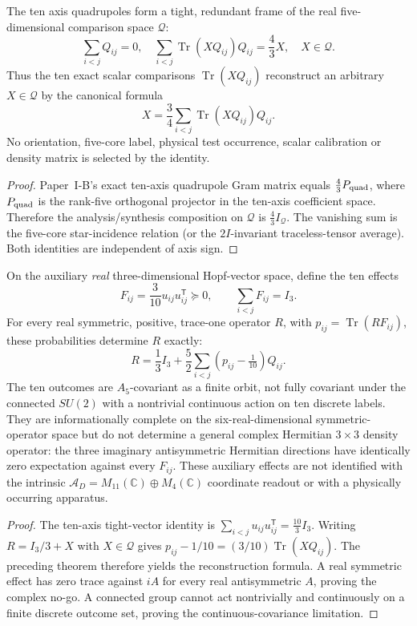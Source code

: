 \documentclass[12pt,a4paper]{article}
\begin{document}
\begin{theorem}
\label{p2c:thm:v318-quadrupole-tomography}
The ten axis quadrupoles form a tight, redundant frame of the real
five-dimensional comparison space $\mathcal Q$:
\[
 \sum_{i<j}Q_{ij}=0,\quad
 \sum_{i<j}\operatorname{Tr}(XQ_{ij})Q_{ij}=\frac43X,
 \quad X\in\mathcal Q.
\]
Thus the ten exact scalar comparisons $\operatorname{Tr}(XQ_{ij})$
reconstruct an arbitrary $X\in\mathcal Q$ by the canonical formula
\[
 \boxed{X=\frac34\sum_{i<j}
   \operatorname{Tr}(XQ_{ij})Q_{ij}.}
\]
No orientation, five-core label, physical test occurrence, scalar
calibration or density matrix is selected by the identity.
\end{theorem}
\begin{proof}
Paper~I-B's exact ten-axis quadrupole Gram matrix equals
$\frac43P_{\rm quad}$, where $P_{\rm quad}$ is the rank-five
orthogonal projector in the ten-axis coefficient space.  Therefore
the analysis/synthesis composition on $\mathcal Q$ is
$\frac43I_{\mathcal Q}$.  The vanishing sum is the five-core
star-incidence relation (or the $2I$-invariant traceless-tensor
average).  Both identities are independent of axis sign.
\end{proof}

\begin{theorem}
\label{p2c:thm:v318-real-petersen-povm}
On the auxiliary \emph{real} three-dimensional Hopf-vector space,
define the ten effects
\[
 F_{ij}=\frac3{10}u_{ij}u_{ij}^{\mathsf T}\succeq0,
 \qquad\sum_{i<j}F_{ij}=I_3.
\]
For every real symmetric, positive, trace-one operator $R$, with
$p_{ij}=\operatorname{Tr}(RF_{ij})$, these probabilities determine $R$
exactly:
\[
 \boxed{R=\frac13I_3+\frac52\sum_{i<j}
                  (p_{ij}-\tfrac1{10})Q_{ij}.}
\]
The ten outcomes are $A_5$-covariant as a finite orbit, not fully
covariant under the connected $SU(2)$ with a nontrivial continuous
action on ten discrete labels.  They are informationally complete on
the six-real-dimensional symmetric-operator space but do not determine
a general complex Hermitian $3\times3$ density operator: the three
imaginary antisymmetric Hermitian directions have identically zero
expectation against every $F_{ij}$.
These auxiliary effects are not identified with the intrinsic
$\mathcal A_D=M_{11}(\mathbb C)\oplus M_4(\mathbb C)$ coordinate
readout or with a physically occurring apparatus.
\end{theorem}
\begin{proof}
The ten-axis tight-vector identity is
$\sum_{i<j}u_{ij}u_{ij}^{\mathsf T}=\frac{10}{3}I_3$.
Writing $R=I_3/3+X$ with $X\in\mathcal Q$ gives
$p_{ij}-1/10=(3/10)\operatorname{Tr}(XQ_{ij})$.
The preceding theorem therefore yields the reconstruction formula.
A real symmetric effect has zero trace against $iA$ for every real
antisymmetric $A$, proving the complex no-go.  A connected group
cannot act nontrivially and continuously on a finite discrete
outcome set, proving the continuous-covariance limitation.
\end{proof}
\end{document}
